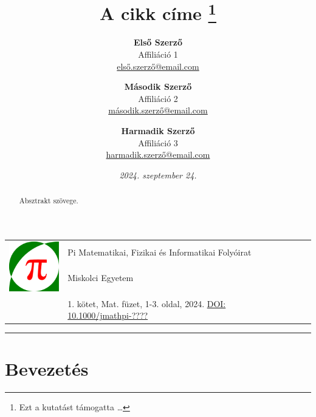 \documentclass[a4paper,12pt]{article}
\begin{document}
\pagestyle{fancy}

\title{\sc A cikk címe \thanks{Ezt a kutatást támogatta \dots}}

\author{
	\textbf{Első Szerző} \\
	Affiliáció 1 \\
	\href{mailto:első.szerző@email.com}{első.szerző@email.com}
\and
	\textbf{Második Szerző} \\
	Affiliáció 2 \\
	\href{mailto:második.szerző@email.com}{második.szerző@email.com}
\and
	\textbf{Harmadik Szerző} \\
	Affiliáció 3 \\
	\href{mailto:harmadik.szerző@email.com}{harmadik.szerző@email.com}
}

\date{\textit{2024. szeptember 24.}}

\noindent \begin{tabular}{lp{13cm}}
	\multirow{3}{*}{\includegraphics[width=22mm, height=22mm]{jmathpi_logo.pdf}}
	& Pi Matematikai, Fizikai és Informatikai Folyóirat \\
	& Miskolci Egyetem \\
	& \\
	& 1. kötet, Mat. füzet, 1-3. oldal, 2024. \hfill \href{https://doi.org/10.1000/jmathpi-1}{DOI: 10.1000/jmathpi-????} \\
\end{tabular}

\bigskip

\hrule

{\let\newpage\relax\maketitle}

\begin{abstract}
Absztrakt szövege.
\end{abstract}

{\def\thefootnote{}}

\section{Bevezetés}
\end{document}
